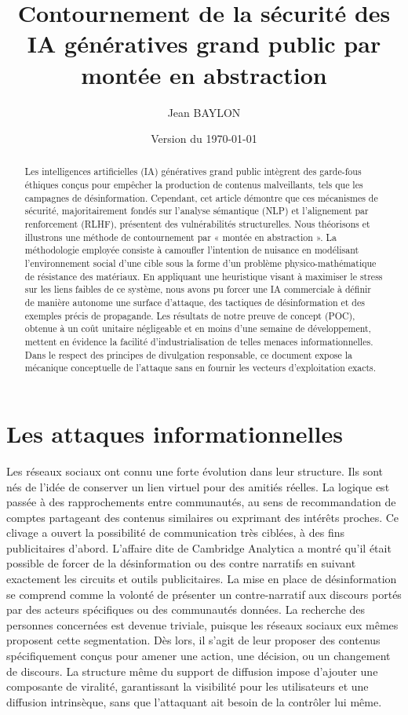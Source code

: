 \documentclass[11pt]{article}
\author{Jean BAYLON}
\title{Contournement de la sécurité des IA génératives grand public par montée en abstraction}
\date{Version du \today{}}
\begin{document}
	\maketitle
		
		
	\begin{abstract}
		Les intelligences artificielles (IA) génératives grand public intègrent des garde-fous éthiques conçus pour empêcher la production de contenus malveillants, tels que les campagnes de désinformation. Cependant, cet article démontre que ces mécanismes de sécurité, majoritairement fondés sur l'analyse sémantique (NLP) et l'alignement par renforcement (RLHF), présentent des vulnérabilités structurelles. Nous théorisons et illustrons une méthode de contournement par « montée en abstraction ». La méthodologie employée consiste à camoufler l'intention de nuisance en modélisant l'environnement social d'une cible sous la forme d'un problème physico-mathématique de résistance des matériaux. En appliquant une heuristique visant à maximiser le stress sur les liens faibles de ce système, nous avons pu forcer une IA commerciale à définir de manière autonome une surface d'attaque, des tactiques de désinformation et des exemples précis de propagande. Les résultats de notre preuve de concept (POC), obtenue à un coût unitaire négligeable et en moins d'une semaine de développement, mettent en évidence la facilité d'industrialisation de telles menaces informationnelles. Dans le respect des principes de divulgation responsable, ce document expose la mécanique conceptuelle de l'attaque sans en fournir les vecteurs d'exploitation exacts.
	\end{abstract}
	
		
	\section{Les attaques informationnelles}
	
		Les réseaux sociaux ont connu une forte évolution dans leur structure. Ils sont nés de l'idée de conserver un lien virtuel pour des amitiés réelles. La logique est passée à des rapprochements entre communautés, au sens de recommandation de comptes partageant des contenus similaires ou exprimant des intérêts proches. Ce clivage a ouvert la possibilité de communication très ciblées, à des fins publicitaires d'abord. L'affaire dite de \og{}Cambridge Analytica\fg{} a montré qu'il était possible de forcer de la désinformation ou des contre narratifs en suivant exactement les circuits et outils publicitaires. La mise en place de désinformation se comprend comme la volonté de présenter un contre-narratif aux discours portés par des acteurs spécifiques ou des communautés données. La recherche des personnes concernées est devenue triviale, puisque les réseaux sociaux eux mêmes proposent cette segmentation. Dès lors, il s'agit de leur proposer des contenus spécifiquement conçus pour amener une action, une décision, ou un changement de discours. La structure même du support de diffusion impose d'ajouter une composante de viralité, garantissant la visibilité pour les utilisateurs et une diffusion intrinsèque, sans que l'attaquant ait besoin de la contrôler lui même. 
		
\end{document}
